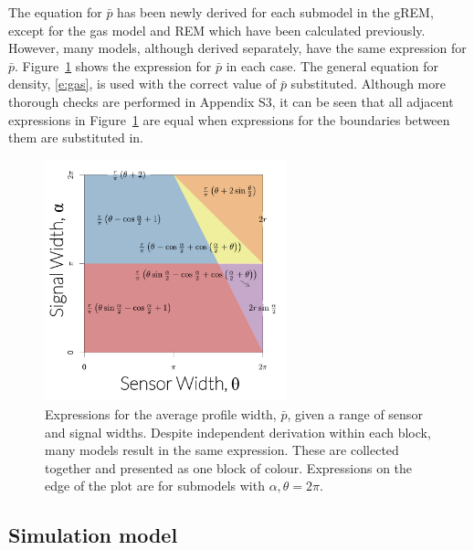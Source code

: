 The equation for $\bar{p}$ has been newly derived for each submodel in the gREM, except for the gas model and REM which have been calculated previously.
However, many models, although derived separately, have the same expression for $\bar{p}$.
Figure~\ref{f:equalModelResults} shows the expression for $\bar{p}$ in each case.
The general equation for density, \ref{e:gas}, is used with the correct value of $\bar{p}$ substituted.
Although more thorough checks are performed in Appendix S3, it can be seen that all adjacent expressions in Figure~\ref{f:equalModelResults} are equal when expressions for the boundaries between them are substituted in.



\begin{knitrout}\footnotesize
{}\color{fgcolor}\begin{kframe}


{\ttfamily\noindent\bfseries{}}\end{kframe}
\end{knitrout}


\begin{figure}
	\centering
	\includegraphics[width=7cm]{imgs/equalRegionsExpressions.pdf}
	\caption[Expressions for the average profile width]{
Expressions for the average profile width, $\bar{p}$, given a range of sensor and signal widths.
Despite independent derivation within each block, many models result in the same expression.
These are collected together and presented as one block of colour.
Expressions on the edge of the plot are for submodels with $\alpha, \theta = 2\pi$. }
	\label{f:equalModelResults}
\end{figure}


\subsection{Simulation model}

